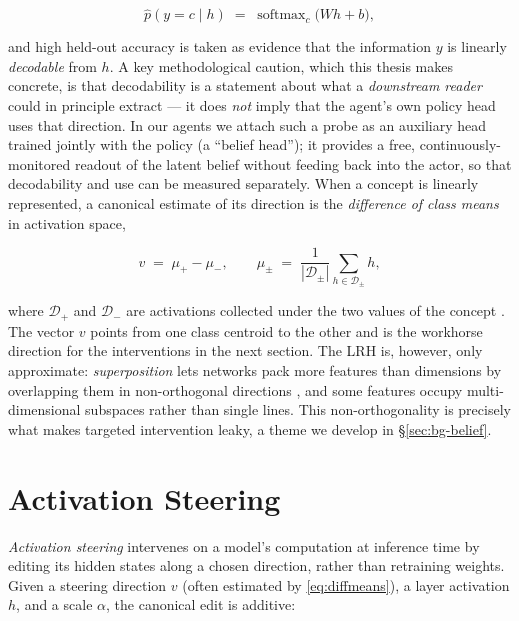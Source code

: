 \begin{equation}
    \hat{p}(y = c \mid h) \;=\; \operatorname{softmax}_c\!\big(W h + b\big),
    \label{eq:probe}
\end{equation}

and high held-out accuracy is taken as evidence that the information $y$ is
linearly \emph{decodable} from $h$. A key methodological caution, which this
thesis makes concrete, is that decodability is a statement about what a
\emph{downstream reader} could in principle extract --- it does \emph{not} imply
that the agent's own policy head uses that direction. In our agents we attach
such a probe as an auxiliary head trained jointly with the policy (a
``belief head''); it provides a free, continuously-monitored readout of the
latent belief without feeding back into the actor, so that decodability and use
can be measured separately. When a concept is linearly represented, a canonical
estimate of its direction is the \emph{difference of class means} in activation
space,

\begin{equation}
    v \;=\; \mu_{+} - \mu_{-}, \qquad
    \mu_{\pm} \;=\; \frac{1}{|\mathcal{D}_{\pm}|} \sum_{h \in \mathcal{D}_{\pm}} h,
    \label{eq:diffmeans}
\end{equation}

where $\mathcal{D}_{+}$ and $\mathcal{D}_{-}$ are activations collected under the
two values of the concept \citep{marks2024geometry}. The vector $v$ points from
one class centroid to the other and is the workhorse direction for the
interventions in the next section. The LRH is, however, only approximate:
\emph{superposition} lets networks pack more features than dimensions by
overlapping them in non-orthogonal directions \citep{elhage2022superposition},
and some features occupy multi-dimensional subspaces rather than single lines.
This non-orthogonality is precisely what makes targeted intervention leaky, a
theme we develop in \S\ref{sec:bg-belief}.

\section{Activation Steering}
\label{sec:bg-steering}

\emph{Activation steering} intervenes on a model's computation at inference time
by editing its hidden states along a chosen direction, rather than retraining
weights. Given a steering direction $v$ (often estimated by
\eqref{eq:diffmeans}), a layer activation $h$, and a scale $\alpha$, the
canonical edit is additive:

